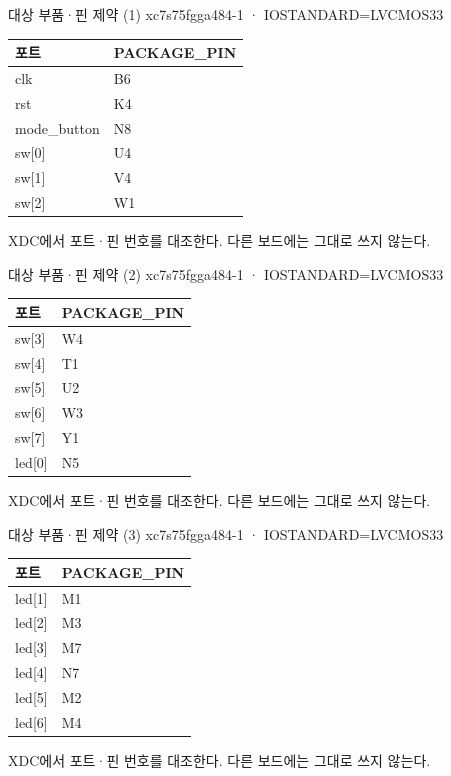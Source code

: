 \begin{frame}{대상 부품·핀 제약 (1)}\relax
\small
xc7s75fgga484-1 · IOSTANDARD=LVCMOS33\par\begin{center}\renewcommand{\arraystretch}{1.45}
\begin{tabular}{l|l}
포트 & PACKAGE\_PIN\\\hline
clk & B6\\
rst & K4\\
mode\_button & N8\\
sw[0] & U4\\
sw[1] & V4\\
sw[2] & W1\\
\end{tabular}\end{center}
XDC에서 포트·핀 번호를 대조한다. 다른 보드에는 그대로 쓰지 않는다.\par
\end{frame}

\begin{frame}{대상 부품·핀 제약 (2)}\relax
\small
xc7s75fgga484-1 · IOSTANDARD=LVCMOS33\par\begin{center}\renewcommand{\arraystretch}{1.45}
\begin{tabular}{l|l}
포트 & PACKAGE\_PIN\\\hline
sw[3] & W4\\
sw[4] & T1\\
sw[5] & U2\\
sw[6] & W3\\
sw[7] & Y1\\
led[0] & N5\\
\end{tabular}\end{center}
XDC에서 포트·핀 번호를 대조한다. 다른 보드에는 그대로 쓰지 않는다.\par
\end{frame}

\begin{frame}{대상 부품·핀 제약 (3)}\relax
\small
xc7s75fgga484-1 · IOSTANDARD=LVCMOS33\par\begin{center}\renewcommand{\arraystretch}{1.45}
\begin{tabular}{l|l}
포트 & PACKAGE\_PIN\\\hline
led[1] & M1\\
led[2] & M3\\
led[3] & M7\\
led[4] & N7\\
led[5] & M2\\
led[6] & M4\\
\end{tabular}\end{center}
XDC에서 포트·핀 번호를 대조한다. 다른 보드에는 그대로 쓰지 않는다.\par
\end{frame}

